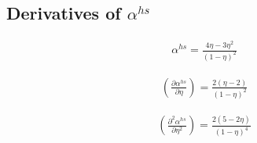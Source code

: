 \documentclass[english]{../thermomemo/thermomemo}
\newcommand*{\pder}[2]{\left(\frac{\partial #1}{\partial #2}\right)}
\newcommand*{\pdder}[2]{\left(\frac{\partial^2 #1}{\partial #2^2}\right)}
\newcommand*{\pdcross}[3]{\left(\frac{\partial^2 #1}{\partial #2 \partial #3}\right)}
\newcommand{\z}{\zeta}
\newcommand{\lp}{\left(}
\newcommand{\rp}{\right)}
\begin{document}
\subsection{Derivatives of $\alpha^{hs}$}
\begin{align}
  \alpha^{hs} = \frac{4\eta-3\eta^2}{(1-\eta)^2}
\end{align}

\begin{align}
  \pder{\alpha^{hs}}{\eta} = \frac{2(\eta-2)}{(1-\eta)^2}
\end{align}

\begin{align}
  \pdder{\alpha^{hs}}{\eta} = \frac{2(5-2\eta)}{(1-\eta)^4}
\end{align}


\end{document}
